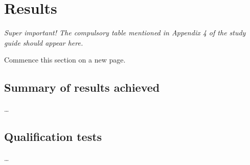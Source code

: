 
\section{Results}

{\slshape
Super important! The compulsory table mentioned in Appendix 4 of the study
guide should appear here.

Commence this section on a new page.
}

\subsection{Summary of results achieved}

\ldots

\subsection{Qualification tests}

\ldots

\newpage



